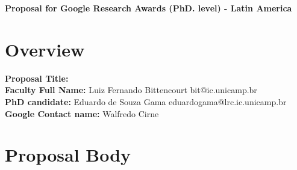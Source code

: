 \documentclass[a4paper, 11pt]{article}
\begin{document}
	\begin{center}
		{\bf Proposal for Google Research Awards (PhD. level) - Latin America}
	\end{center}

	\section{Overview}

	\noindent
	{\bf Proposal Title:} \\
	{\bf Faculty Full Name:} Luiz Fernando Bittencourt \hfill bit@ic.unicamp.br \\
	{\bf PhD candidate:} Eduardo de Souza Gama \hfill eduardogama@lrc.ic.unicamp.br \\
	{\bf Google Contact name:} Walfredo Cirne


	\section{Proposal Body}	
	
	
	
    

    
    
    

    
\end{document}
